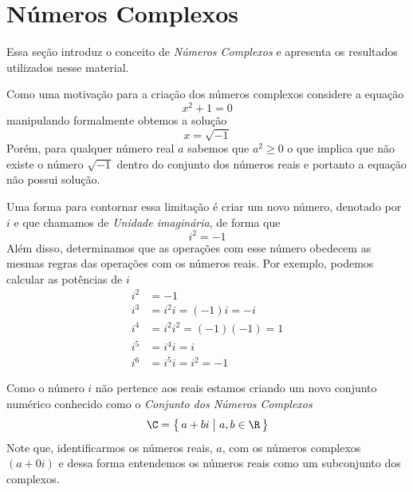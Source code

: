 \section{Números Complexos}
\label{sec:NumerosComplexos}

Essa seção introduz o conceito de \emph{Números Complexos}
e apresenta os resultados utilizados nesse material.


Como uma motivação para a criação dos números complexos considere a equação
\[
  x^2 + 1 = 0
\]
manipulando formalmente obtemos a solução
\[
  x = \sqrt{-1}
\]
Porém, para qualquer número real $a$ sabemos que \(a^2 \geq 0\) o que implica que não existe
o número \(\sqrt{-1}\) dentro do conjunto dos números reais e portanto a equação não possui solução.

Uma forma para contornar essa limitação é criar um novo número, denotado por $i$ e que chamamos de
\emph{Unidade imaginária}, de forma que
\[
  i^2 = -1
\]
Além disso, determinamos que as operações com esse número obedecem as mesmas regras das operações com
os números reais. Por exemplo, podemos calcular as potências de $i$
\begin{align*}
	i^2 & = -1                    \\
	i^3 & = i^2i = (-1)i = -i     \\
	i^4 & = i^2i^2 = (-1)(-1) = 1 \\
	i^5 & = i^4i = i              \\
	i^6 & = i^5i = i^2 = -1
\end{align*}

Como o número $i$ não pertence aos reais estamos criando um novo conjunto numérico conhecido como
o \emph{Conjunto dos Números Complexos}
\[
  \C = \big\{\, a+bi \;\big|\; a, b \in \R \,\big\}
\]
Note que, identificarmos os números reais, $a$, com os números complexos \((a+0i)\) e
dessa forma entendemos os números reais como um subconjunto dos complexos.

